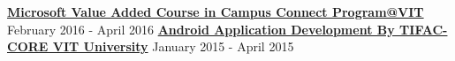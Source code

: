 \vspace{-0.2mm}
\begin{cventries}
    \vspace{-1.3mm}
    \begin{justify}
    {\small
    \textbf{\href{https://raw.githubusercontent.com/googleknight/googleknight.github.io/master/Certificates/Microsoft.jpg}
    {Microsoft Value Added Course in Campus Connect Program@VIT}}
    \hspace{2.54cm}
    \footnotesize
    {February 2016 - April 2016}
    }
    {\newline
    \small
    \textbf{\href{https://github.com/googleknight/googleknight.github.io/raw/master/Certificates/TIFAC.jpg}
    {Android Application Development By TIFAC-CORE VIT University}}
    \footnotesize
    \hspace{1.98cm}
    {January 2015 - April 2015}
    }
    \end{justify}
\end{cventries}